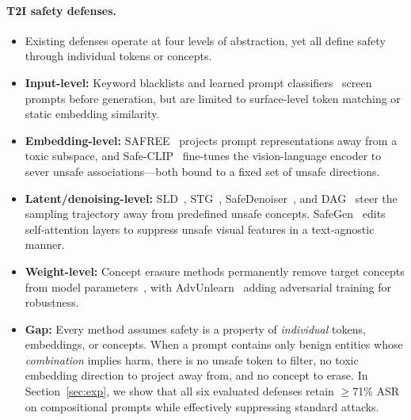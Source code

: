 \documentclass{article}
\begin{document}
\paragraph{T2I safety defenses.}
\begin{itemize}[leftmargin=*,itemsep=2pt]
\item Existing defenses operate at four levels of abstraction, yet all define safety through individual tokens or concepts.

\item \textbf{Input-level:} Keyword blacklists and learned prompt classifiers~\cite{copro_eccv24,safeguider_ccs25} screen prompts before generation, but are limited to surface-level token matching or static embedding similarity.

\item \textbf{Embedding-level:} SAFREE~\cite{safree_iclr25} projects prompt representations away from a toxic subspace, and Safe-CLIP~\cite{safeclip_eccv24} fine-tunes the vision-language encoder to sever unsafe associations---both bound to a fixed set of unsafe directions.

\item \textbf{Latent/denoising-level:} SLD~\cite{sld_cvpr23}, STG~\cite{stg_neurips25}, SafeDenoiser~\cite{safedenoiser_neurips25}, and DAG~\cite{dag_cvpr25} steer the sampling trajectory away from predefined unsafe concepts. SafeGen~\cite{safegen_ccs24} edits self-attention layers to suppress unsafe visual features in a text-agnostic manner.

\item \textbf{Weight-level:} Concept erasure methods permanently remove target concepts from model parameters~\cite{esd_iccv23,salun_iclr24,mace_cvpr24,speed_iclr26,hirm_iclr26}, with AdvUnlearn~\cite{advunlearn_neurips24} adding adversarial training for robustness.

\item \textbf{Gap:} Every method assumes safety is a property of \emph{individual} tokens, embeddings, or concepts. When a prompt contains only benign entities whose \emph{combination} implies harm, there is no unsafe token to filter, no toxic embedding direction to project away from, and no concept to erase. In Section~\ref{sec:exp}, we show that all six evaluated defenses retain ${\geq}$71\% ASR on compositional prompts while effectively suppressing standard attacks.
\end{itemize}
\end{document}
